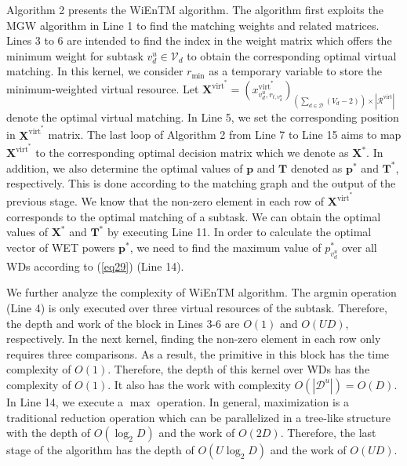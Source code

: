 \documentclass[12pt,draftclsnofoot,onecolumn]{IEEEtran}
\begin{document}
Algorithm 2 presents the WiEnTM algorithm. The algorithm first exploits the MGW algorithm in Line 1 to find the matching weights and related matrices. Lines 3 to 6 are intended to find the index in the weight matrix which offers the minimum weight for subtask $v_d^u\in\mathcal{V}_d$ to obtain the corresponding optimal virtual matching. In this kernel, we consider $r_{\min}$ as a temporary variable to store the minimum-weighted virtual resource. Let $\boldsymbol{X}^{\text{virt}^{\ast}} = \left(x_{v_d^u,r_{t,v_d^u}}^{\text{virt}^{\ast}}\right)_{\left(\sum_{d\in\mathcal{D}}{\left(V_d-2\right)}\right)\times|\mathcal{R}^{\text{virt}}|}$denote the optimal virtual matching. In Line 5, we set the corresponding position in $\boldsymbol{X}^{\text{virt}^{\ast}}$ matrix. The last loop of Algorithm 2 from Line 7 to Line 15 aims to map $\boldsymbol{X}^{\text{virt}^{\ast}}$ to the corresponding optimal decision matrix which we denote as $\boldsymbol{X}^{\ast}$. In addition, we also determine the optimal values of $\boldsymbol{p}$ and $\boldsymbol{T}$ denoted as $\boldsymbol{p}^{\ast}$ and $\boldsymbol{T}^{\ast}$, respectively. This is done according to the matching graph and the output of the previous stage. We know that the non-zero element in each row of $\boldsymbol{X}^{\text{virt}^{\ast}}$ corresponds to the optimal matching of a subtask. We can obtain the optimal values of $\boldsymbol{X}^{\ast}$ and $\boldsymbol{T}^{\ast}$ by executing Line 11. In order to calculate the optimal vector of WET powers $\boldsymbol{p}^{\ast}$, we need to find the maximum value of $p_{v_d^u}^{\ast}$ over all WDs according to (\ref{eq29}) (Line 14).

We further analyze the complexity of WiEnTM algorithm. The argmin operation (Line 4) is only executed over three virtual resources of the subtask. Therefore, the depth and work of the block in Lines 3-6 are $O(1)$ and $O(UD)$, respectively. In the next kernel, finding the non-zero element in each row only requires three comparisons. As a result, the primitive in this block has the time complexity of $O(1)$. Therefore, the depth of this kernel over WDs has the complexity of $O(1)$. It also has the work with complexity $O(|\mathcal{D}^u|)=O(D)$. In Line 14, we execute a $\max$ operation. In general, maximization is a traditional reduction operation which can be parallelized in a tree-like structure with the depth of $O(\log_2D)$ and the work of $O(2D)$. Therefore, the last stage of the algorithm has the depth of $O(U\log_2D)$ and the work of $O(UD)$.
\end{document}
